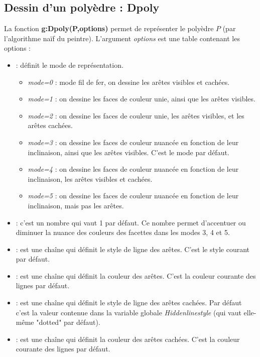 \subsection{Dessin d'un polyèdre : Dpoly}

La fonction \textbf{g:Dpoly(P,options)} permet de représenter le polyèdre $P$ (par l'algorithme naïf du peintre). L'argument \emph{options} est une table contenant les options :
\begin{itemize}
    \item {} : définit le mode de représentation.
        \begin{itemize}
            \item \emph{mode=0} : mode fil de fer, on dessine les arêtes visibles et cachées.
            \item \emph{mode=1} : on dessine les faces de couleur unie, ainsi que les arêtes visibles.
            \item \emph{mode=2} : on dessine les faces de couleur unie, les arêtes visibles, et les arêtes cachées.
            \item \emph{mode=3} : on dessine les faces de couleur nuancée en fonction de leur inclinaison, ainsi que les arêtes visibles. C'est le mode par défaut.
            \item \emph{mode=4} : on dessine les faces de couleur nuancée en fonction de leur inclinaison, les arêtes visibles et cachées.
            \item \emph{mode=5} :  on dessine les faces de couleur nuancée en fonction de leur inclinaison, mais pas les arêtes.
        \end{itemize}
        \item {} : c'est un nombre qui vaut 1 par défaut. Ce nombre permet d'accentuer ou diminuer la nuance des couleurs des facettes dans les modes 3, 4 et 5.
        \item {} : est une chaîne qui définit le style de ligne des arêtes. C'est le style courant par défaut.
        \item {} : est une chaîne qui définit la couleur des arêtes. C'est la couleur courante des lignes par défaut.
        \item {} : est une chaîne qui définit le style de ligne des arêtes cachées. Par défaut c'est la valeur contenue dans la variable globale \emph{Hiddenlinestyle} (qui vaut elle-même "dotted" par défaut).
        \item {} : est une chaîne qui définit la couleur des arêtes cachées. C'est la couleur courante des lignes par défaut.

\end{itemize}

